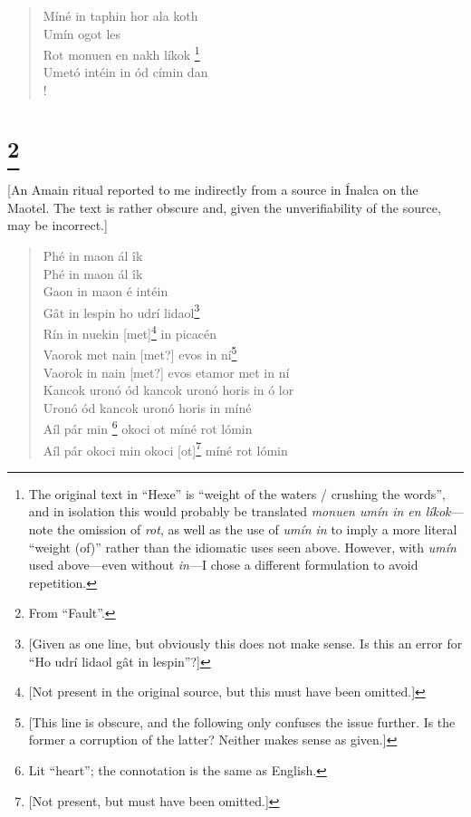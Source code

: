 \documentclass{article}
\let\oldthefootnote\thefootnote
\newcommand\oocfootnote[2][DarkGreen]{\renewcommand\thefootnote{\color{#1}\oldthefootnote}%
  \footnote{\color{#1}#2}%
  \renewcommand{\thefootnote}{\oldthefootnote}}
\begin{document}
\begin{verse}
Míné in taphin hor ala koth \\
Umín ogot les \\
Rot monuen en nakh líkok\oocfootnote{The original text in ``Hexe'' is ``weight of the waters / crushing the words'', and in isolation this would probably be translated \emph{monuen umín in en líkok}—note the omission of \emph{rot}, as well as the use of \emph{umín in} to imply a more literal ``weight (of)'' rather than the idiomatic uses seen above. However, with \emph{umín} used above—even without \emph{in}—I chose a different formulation to avoid repetition.} \\
Umetó intéin in ód címin dan \\!

\end{verse}

\section{\oocfootnote{From ``Fault''.}}

[An Amain ritual reported to me indirectly from a source in Ínalca on the Maotel. The text is rather obscure and, given the unverifiability of the source, may be incorrect.]


\begin{verse}
Phé in maon ál îk \\
Phé in maon ál îk \\
Gaon in maon é intéin \\
Gât in lespin ho udrí lidaol\footnote{[Given as one line, but obviously this does not make sense. Is this an error for ``Ho udrí lidaol gât in lespin''?]} \\
Rín in nuekin [met]\footnote{[Not present in the original source, but this must have been omitted.]} in picacén \\
Vaorok met nain [met?] evos in ní\footnote{[This line is obscure, and the following only confuses the issue further. Is the former a corruption of the latter? Neither makes sense as given.]} \\
Vaorok in nain [met?] evos etamor met in ní \\
Kancok uronó ód kancok uronó horis in ó lor \\
Uronó ód kancok uronó horis in míné \\
Aíl pár min\oocfootnote{Lit ``heart''; the connotation is the same as English.} okoci ot míné rot lómin \\
Aíl pár okoci min okoci [ot]\footnote{[Not present, but must have been omitted.]} míné rot lómin \\

\end{verse}
\end{document}

